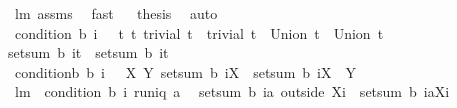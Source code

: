 \begin{isabellebody}
\ lm{}{}\ assms\ \isamarkupfalse%
\ fast\isanewline
{}\isamarkupfalse%
\ \isamarkupfalse%
\ {\isacharquery}thesis\ \isamarkupfalse%
\ auto\isanewline
{}\isamarkupfalse%
%
\endisatagproof
{\isafoldproof}%
%
\isadelimproof
\isanewline
%
\endisadelimproof
\isanewline
{}\isamarkupfalse%
\ {\isachardoublequoteopen}condition{}\ b\ i\ {\isacharequal}{\isacharequal}\ {\isacharparenleft}{\isasymforall}\ t\ t{\isacharprime}{\isachardot}\ {\isacharparenleft}trivial\ t\ {\isacharampersand}\ trivial\ t{\isacharprime}\ {\isacharampersand}\ Union\ t\ {\isasymsubseteq}\ Union\ t{\isacharprime}{\isacharparenright}\ {\isasymlongrightarrow}\isanewline
setsum\ b\ {\isacharparenleft}{\isacharbraceleft}i{\isacharbraceright}{\isasymtimes}t{\isacharparenright}\ {\isasymle}\ setsum\ b\ {\isacharparenleft}{\isacharbraceleft}i{\isacharbraceright}{\isasymtimes}t{\isacharprime}{\isacharparenright}{\isacharparenright}{\isachardoublequoteclose}\ \isanewline
\isanewline
\isanewline
{}\isamarkupfalse%
\ {\isachardoublequoteopen}condition{}b\ b\ i\ {\isacharequal}{\isacharequal}\ {\isasymforall}\ X\ Y{\isachardot}\ setsum\ b\ {\isacharparenleft}{\isacharbraceleft}i{\isacharbraceright}{\isasymtimes}{\isacharbraceleft}X{\isacharbraceright}{\isacharparenright}\ {\isasymle}\ setsum\ b\ {\isacharparenleft}{\isacharbraceleft}i{\isacharbraceright}{\isasymtimes}{\isacharbraceleft}X\ {\isasymunion}\ Y{\isacharbraceright}{\isacharparenright}{\isachardoublequoteclose}\isanewline
\isanewline
{}\isamarkupfalse%
\ lm{}{}{\isacharcolon}\ \ {\isachardoublequoteopen}condition{}\ b\ i{\isachardoublequoteclose}\ {\isachardoublequoteopen}runiq\ a{\isachardoublequoteclose}\ \ \isanewline
{\isachardoublequoteopen}setsum\ b\ {\isacharparenleft}{\isacharbraceleft}i{\isacharbraceright}{\isasymtimes}{\isacharparenleft}{\isacharparenleft}a\ outside\ X{\isacharparenright}{\isacharbackquote}{\isacharbackquote}{\isacharbraceleft}i{\isacharbraceright}{\isacharparenright}{\isacharparenright}\ {\isasymle}\ setsum\ b\ {\isacharparenleft}{\isacharbraceleft}i{\isacharbraceright}{\isasymtimes}{\isacharbraceleft}{\isasymUnion}{\isacharparenleft}a{\isacharbackquote}{\isacharbackquote}{\isacharparenleft}X{\isasymunion}{\isacharbraceleft}i{\isacharbraceright}{\isacharparenright}{\isacharparenright}{\isacharbraceright}{\isacharparenright}{\isachardoublequoteclose}\isanewline

\end{isabellebody}
